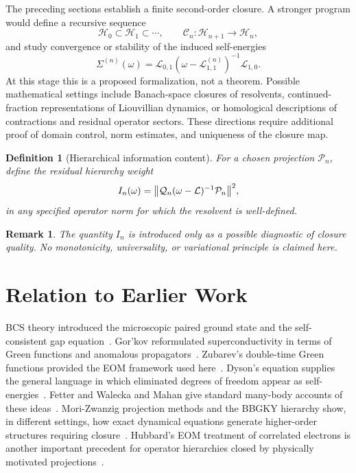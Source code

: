 \documentclass[aps,prb,reprint,superscriptaddress,nofootinbib]{revtex4-2}
\newtheorem{definition}{Definition}
\newtheorem{remark}{Remark}
\newcommand{\Liouv}{\mathcal{L}}
\newcommand{\Hh}{\mathcal{H}}
\newcommand{\Pc}{\mathcal{P}}
\newcommand{\Qc}{\mathcal{Q}}
\newcommand{\Cc}{\mathcal{C}}
\begin{document}
The preceding sections establish a finite second-order closure. A stronger program would define a recursive sequence
\begin{equation}
\Hh_0\subset\Hh_1\subset\cdots,\qquad
\Cc_n:\Hh_{n+1}\to\Hh_n,
\end{equation}
and study convergence or stability of the induced self-energies
\begin{equation}
\Sigma^{(n)}(\omega)
=\Liouv_{0,1}(\omega-\Liouv_{1,1}^{(n)})^{-1}\Liouv_{1,0}.
\end{equation}
At this stage this is a proposed formalization, not a theorem. Possible mathematical settings include Banach-space closures of resolvents, continued-fraction representations of Liouvillian dynamics, or homological descriptions of contractions and residual operator sectors. These directions require additional proof of domain control, norm estimates, and uniqueness of the closure map.

\begin{definition}[Hierarchical information content]
For a chosen projection \(\Pc_n\), define the residual hierarchy weight
\begin{equation}
I_n(\omega)=
\norm{\Qc_n(\omega-\Liouv)^{-1}\Pc_n}^{2},
\end{equation}
in any specified operator norm for which the resolvent is well-defined.
\end{definition}

\begin{remark}
The quantity \(I_n\) is introduced only as a possible diagnostic of closure quality. No monotonicity, universality, or variational principle is claimed here.
\end{remark}

\section{Relation to Earlier Work}

BCS theory introduced the microscopic paired ground state and the self-consistent gap equation~\cite{Bardeen1957}. Gor'kov reformulated superconductivity in terms of Green functions and anomalous propagators~\cite{Gorkov1958}. Zubarev's double-time Green functions provided the EOM framework used here~\cite{Zubarev1960}. Dyson's equation supplies the general language in which eliminated degrees of freedom appear as self-energies~\cite{Dyson1949}. Fetter and Walecka and Mahan give standard many-body accounts of these ideas~\cite{FetterWalecka1971,Mahan2000}. Mori-Zwanzig projection methods and the BBGKY hierarchy show, in different settings, how exact dynamical equations generate higher-order structures requiring closure~\cite{Mori1965,Zwanzig1960,Yvon1935,BornGreen1946,Kirkwood1946,Bogoliubov1962}. Hubbard's EOM treatment of correlated electrons is another important precedent for operator hierarchies closed by physically motivated projections~\cite{Hubbard1963}.
\end{document}
